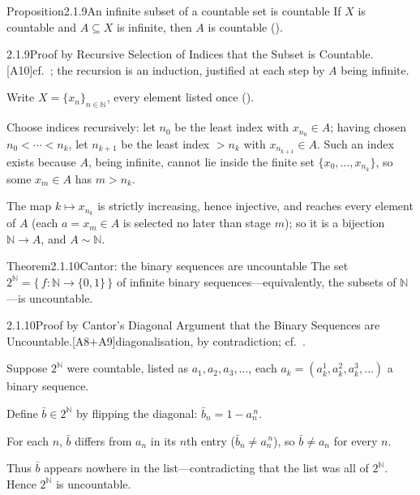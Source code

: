 \documentclass[main.tex]{subfiles}
\begin{document}
\begin{Obj}{Proposition}{2.1.9}{An infinite subset of a countable set is countable}
If $X$ is countable and $A\subseteq X$ is infinite, then $A$ is countable ().
\end{Obj}
\begin{Prf}{2.1.9}{Proof by Recursive Selection of Indices that the Subset is Countable.}{[A10]\quad cf.\ ; the recursion is an induction, justified at each step by $A$ being infinite.}
\item Write $X=\{x_n\}_{n\in\mathbb N}$, every element listed once ().
\item Choose indices recursively: let $n_0$ be the least index with $x_{n_0}\in A$; having chosen
  $n_0<\cdots<n_k$, let $n_{k+1}$ be the least index $>n_k$ with $x_{n_{k+1}}\in A$. Such an index
  exists because $A$, being infinite, cannot lie inside the finite set $\{x_0,\dots,x_{n_k}\}$, so
  some $x_m\in A$ has $m>n_k$.
\item The map $k\mapsto x_{n_k}$ is strictly increasing, hence injective, and reaches every element
  of $A$ (each $a=x_m\in A$ is selected no later than stage $m$); so it is a bijection
  $\mathbb N\to A$, and $A\sim\mathbb N$.
\end{Prf}

\begin{Obj}{Theorem}{2.1.10}{Cantor: the binary sequences are uncountable}
The set $2^{\mathbb N}=\{\,f:\mathbb N\to\{0,1\}\,\}$ of infinite binary sequences---equivalently, the
subsets of $\mathbb N$---is uncountable.
\end{Obj}
\begin{Prf}{2.1.10}{Proof by Cantor's Diagonal Argument that the Binary Sequences are Uncountable.}{[A8$+$A9]\quad diagonalisation, by contradiction; cf.\ .}
\item Suppose $2^{\mathbb N}$ were countable, listed as $a_1,a_2,a_3,\dots$, each
  $a_k=(a_k^1,a_k^2,a_k^3,\dots)$ a binary sequence.
\item Define $\bar b\in 2^{\mathbb N}$ by flipping the diagonal: $\bar b_n=1-a_n^{\,n}$.
\item For each $n$, $\bar b$ differs from $a_n$ in its $n$th entry ($\bar b_n\neq a_n^{\,n}$), so
  $\bar b\neq a_n$ for every $n$.
\item Thus $\bar b$ appears nowhere in the list---contradicting that the list was all of
  $2^{\mathbb N}$. Hence $2^{\mathbb N}$ is uncountable.
\end{Prf}
\end{document}
